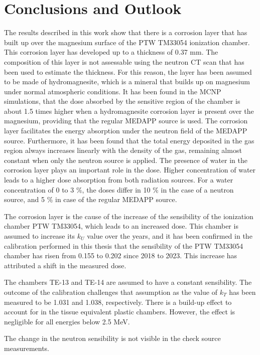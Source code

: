 \chapter{Conclusions and Outlook}

The results described in this work show that there is a corrosion layer that has built up over the magnesium surface of the PTW TM33054 ionization chamber. This corrosion layer has developed up to a thickness of 0.37 \unit{\milli\meter}. The composition of this layer is not assessable using the neutron CT scan that has been used to estimate the thickness. For this reason, the layer has been assumed to be made of hydromagnesite, which is a mineral that builds up on magnesium under normal atmospheric conditions. It has been found in the MCNP simulations, that the dose absorbed by the sensitive region of the chamber is about 1.5 times higher when a hydromagnesite corrosion layer is present over the magnesium, providing that the regular MEDAPP source is used. The corrosion layer facilitates the energy absorption under the neutron field of the MEDAPP source. Furthermore, it has been found that the total energy deposited in the gas region always increases linearly with the density of the gas, remaining almost constant when only the neutron source is applied. The presence of water in the corrosion layer plays an important role in the dose. Higher concentration of water leads to a higher dose absorption from both radiation sources. For a water concentration of 0 to 3 $\%$, the doses differ in 10 $\%$ in the case of a neutron source, and 5 $\%$ in case of the regular MEDAPP source.

The corrosion layer is the cause of the increase of the sensibility of the ionization chamber PTW TM33054, which leads to an increased dose. This chamber is assumed to increase its $k_U$ value over the years, and it has been confirmed in the calibration performed in this thesis that the sensibility of the PTW TM33054 chamber has risen from 0.155 to 0.202 since 2018 to 2023. This increase has attributed a shift in the measured dose. 

The chambers TE-13 and TE-14 are assumed to have a constant sensibility. The outcome of the calibration challenges that assumption as the value of $k_T$ has been measured to be 1.031 and 1.038, respectively. There is a build-up effect to account for in the tissue equivalent plastic chambers. However, the effect is negligible for all energies below 2.5 \unit{\mega\electronvolt}.

The change in the neutron sensibility is not visible in the check source measurements.


